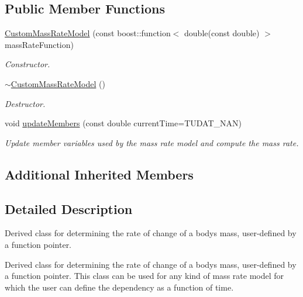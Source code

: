 \subsection*{Public Member Functions}
\begin{DoxyCompactItemize}
\item 
\hyperlink{classtudat_1_1basic__astrodynamics_1_1CustomMassRateModel_a3b7643f3a361abb9cff9a56793ed9fb1}{Custom\+Mass\+Rate\+Model} (const boost\+::function$<$ double(const double) $>$ mass\+Rate\+Function)
\begin{DoxyCompactList}\small\item\em Constructor. \end{DoxyCompactList}\item 
\hyperlink{classtudat_1_1basic__astrodynamics_1_1CustomMassRateModel_a9d1cccf92a73639b48121643cd84596e}{$\sim$\+Custom\+Mass\+Rate\+Model} ()\hypertarget{classtudat_1_1basic__astrodynamics_1_1CustomMassRateModel_a9d1cccf92a73639b48121643cd84596e}{}\label{classtudat_1_1basic__astrodynamics_1_1CustomMassRateModel_a9d1cccf92a73639b48121643cd84596e}

\begin{DoxyCompactList}\small\item\em Destructor. \end{DoxyCompactList}\item 
void \hyperlink{classtudat_1_1basic__astrodynamics_1_1CustomMassRateModel_a60655ab7f951063ed436fcbd6b6073ee}{update\+Members} (const double current\+Time=T\+U\+D\+A\+T\+\_\+\+N\+AN)
\begin{DoxyCompactList}\small\item\em Update member variables used by the mass rate model and compute the mass rate. \end{DoxyCompactList}\end{DoxyCompactItemize}
\subsection*{Additional Inherited Members}


\subsection{Detailed Description}
Derived class for determining the rate of change of a body\textquotesingle{}s mass, user-\/defined by a function pointer. 

Derived class for determining the rate of change of a body\textquotesingle{}s mass, user-\/defined by a function pointer. This class can be used for any kind of mass rate model for which the user can define the dependency as a function of time. 

